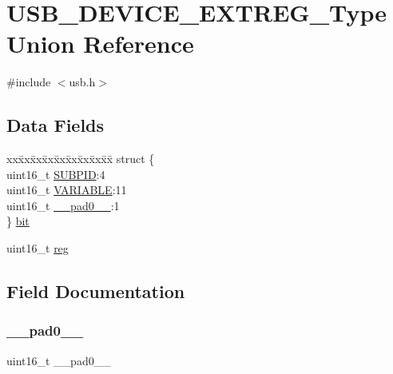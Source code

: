 \hypertarget{union_u_s_b___d_e_v_i_c_e___e_x_t_r_e_g___type}{}\section{U\+S\+B\+\_\+\+D\+E\+V\+I\+C\+E\+\_\+\+E\+X\+T\+R\+E\+G\+\_\+\+Type Union Reference}
\label{union_u_s_b___d_e_v_i_c_e___e_x_t_r_e_g___type}


{\ttfamily \#include $<$usb.\+h$>$}

\subsection*{Data Fields}
\begin{DoxyCompactItemize}
\item 
\begin{tabbing}
xx\=xx\=xx\=xx\=xx\=xx\=xx\=xx\=xx\=\kill
struct \{\\
\>uint16\_t \mbox{\hyperlink{union_u_s_b___d_e_v_i_c_e___e_x_t_r_e_g___type_afd031d1cb3ff27616a046fd5bc5b8d0c}{SUBPID}}:4\\
\>uint16\_t \mbox{\hyperlink{union_u_s_b___d_e_v_i_c_e___e_x_t_r_e_g___type_a93176bd4b468edc2704474a2aa255b5f}{VARIABLE}}:11\\
\>uint16\_t \mbox{\hyperlink{union_u_s_b___d_e_v_i_c_e___e_x_t_r_e_g___type_a77132c2c26a75f5b8751b235cda23828}{\_\_pad0\_\_}}:1\\
\} \mbox{\hyperlink{union_u_s_b___d_e_v_i_c_e___e_x_t_r_e_g___type_a5ea0f6156b7671f93bf2656ba759498e}{bit}}\\

\end{tabbing}\item 
uint16\+\_\+t \mbox{\hyperlink{union_u_s_b___d_e_v_i_c_e___e_x_t_r_e_g___type_a11760f5020019f4aa8cb02e694f7cc44}{reg}}
\end{DoxyCompactItemize}


\subsection{Field Documentation}
\mbox{\label{union_u_s_b___d_e_v_i_c_e___e_x_t_r_e_g___type_a77132c2c26a75f5b8751b235cda23828}} 
\subsubsection{\texorpdfstring{\_\_pad0\_\_}{\_\_pad0\_\_}}
{\footnotesize\ttfamily uint16\+\_\+t \+\_\+\+\_\+pad0\+\_\+\+\_\+}

